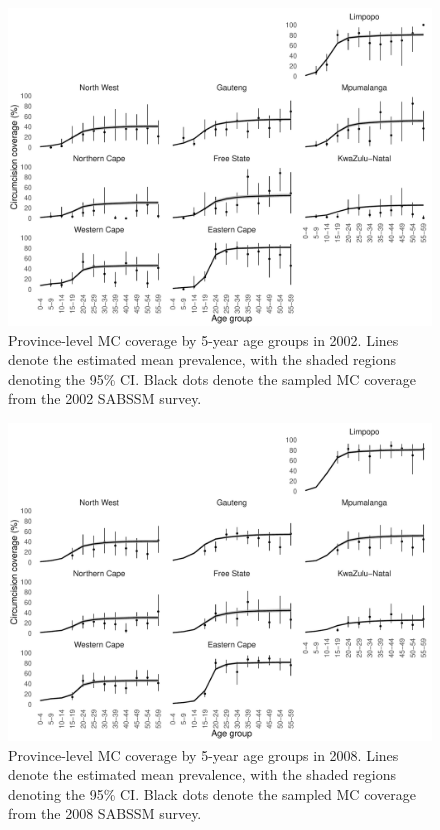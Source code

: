 \documentclass{article}
\begin{document}
\begin{appendix}

\begin{figure}[H]
	\centering
	\includegraphics[width = \linewidth]{Figures/suppmat/ModelFit/TotalPrev_5year_Province_2002_withsurveypoints}
	\caption{Province-level MC coverage by 5-year age groups in 2002. Lines denote the estimated mean prevalence, with the shaded regions denoting the 95\% CI. Black dots denote the sampled MC coverage from the 2002 SABSSM survey.}
\end{figure}


\begin{figure}[H]
	\centering
	\includegraphics[width = \linewidth]{Figures/suppmat/ModelFit/TotalPrev_5year_Province_2008_withsurveypoints}
	\caption{Province-level MC coverage by 5-year age groups in 2008. Lines denote the estimated mean prevalence, with the shaded regions denoting the 95\% CI. Black dots denote the sampled MC coverage from the 2008 SABSSM survey.}
\end{figure}


\end{appendix}
\end{document}

